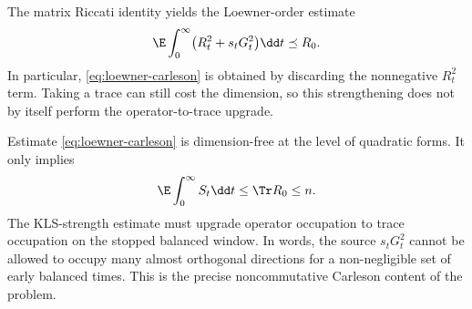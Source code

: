 \documentclass[../../main.tex]{subfiles}
\begin{document}
\begin{corollary}
\label{cor:full-matrix-dissipation}
The matrix Riccati identity yields the Loewner-order estimate
\begin{equation}\label{eq:full-matrix-dissipation}
  \E\int_0^\infty\bigl(R_t^2+s_tG_t^2\bigr)\dd t\preceq R_0.
\end{equation}
In particular, \eqref{eq:loewner-carleson} is obtained by discarding the nonnegative
$R_t^2$ term. Taking a trace can still cost the dimension, so this strengthening does not by
itself perform the operator-to-trace upgrade.
\end{corollary}

\begin{remark}
Estimate \eqref{eq:loewner-carleson} is dimension-free at the level of quadratic forms. It only
implies
\[
  \E\int_0^\infty S_t\dd t\le\Tr R_0\le n.
\]
The KLS-strength estimate must upgrade operator occupation to trace occupation on the stopped
balanced window. In words, the source $s_tG_t^2$ cannot be allowed to occupy many almost orthogonal
directions for a non-negligible set of early balanced times. This is the precise noncommutative
Carleson content of the problem.
\end{remark}
\end{document}
